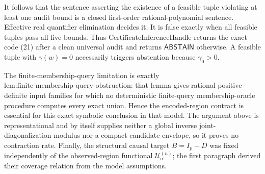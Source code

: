 It follows that the sentence asserting the existence of a feasible tuple violating at least one audit bound is a closed first-order rational-polynomial sentence.  Effective real quantifier elimination decides it.  It is false exactly when all feasible tuples pass all five bounds.  Thus \(\text{CertificateInferenceHandle}\) returns the exact code (21) after a clean universal audit and returns \(\mathsf{ABSTAIN}\) otherwise.  A feasible tuple with \(\gamma(w)=0\) necessarily triggers abstention because \(\gamma _0>0\).

The finite-membership-query limitation is exactly \(\text{lem:finite-membership-query-obstruction}\): that lemma gives rational positive-definite input families for which no deterministic finite-query membership-oracle procedure computes every exact union.  Hence the encoded-region contract is essential for this exact symbolic conclusion in that model.  The argument above is representational and by itself supplies neither a global inverse joint-diagonalization modulus nor a compact candidate envelope, so it proves no contraction rate.  Finally, the structural causal target \(B=I_p-D\) was fixed independently of the observed-region functional \(\mathcal U^{(n)}_\alpha\); the first paragraph derived their coverage relation from the model assumptions.